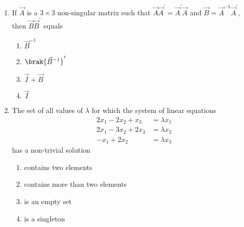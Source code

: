\begin{enumerate}[label=\thesubsection.\arabic*.,ref=\thesubsection.\theenumi]
%
	\item If $\vec{A}$ is a $3\times3$ non-singular matrix such that $\vec{A}\vec{A}^{\prime}=\vec{A}^{\prime}\vec{A}$ and $\vec{B}=\vec{A}^{-1}\vec{A}^{\prime}$, then $\vec{B}\vec{B}^{\prime}$ equals
	\hfill {}{\par}
\begin{multicols}{4}
	\begin{enumerate}
	    	\item $\vec{B}^{-1}$
		\item $\brak{\vec{B}^{-1}}^{\prime}$
		\item $\vec{I}+\vec{B}$ 
		\item $\vec{I}$
        \end{enumerate}
\end{multicols}
%
    \item The set of all values of $\lambda$ for which the system of linear equations
	\begin{align*}
		2x_1-2x_2+x_3 &= \lambda x_1\\
		2x_1-3x_2+2x_3 &= \lambda x_2\\
		-x_1+2x_2 &= \lambda x_3
	\end{align*}
	has a non-trivial solution
	\hfill{}
\begin{multicols}{2}
	\begin{enumerate}
		\item contains two elements
		\item contains more than two elements
		\item is an empty set
		\item is a singleton
	\end{enumerate}
\end{multicols}
%


\end{enumerate}
